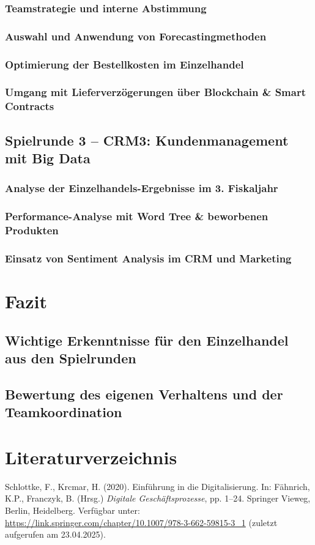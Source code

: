 \documentclass[a4paper,12pt]{article}
\begin{document}
\subsubsection{Teamstrategie und interne Abstimmung}
\subsubsection{Auswahl und Anwendung von Forecastingmethoden}
\subsubsection{Optimierung der Bestellkosten im Einzelhandel}
\subsubsection{Umgang mit Lieferverzögerungen über Blockchain \& Smart Contracts}

\subsection{Spielrunde 3 – CRM3: Kundenmanagement mit Big Data}
\subsubsection{Analyse der Einzelhandels-Ergebnisse im 3. Fiskaljahr}
\subsubsection{ Performance-Analyse mit Word Tree \& beworbenen Produkten}
\subsubsection{Einsatz von Sentiment Analysis im CRM und Marketing}
\section{Fazit}
\subsection{Wichtige Erkenntnisse für den Einzelhandel aus den Spielrunden}
\subsection{Bewertung des eigenen Verhaltens und der Teamkoordination}
\newpage
{}
\section*{Literaturverzeichnis}
\begin{thebibliography}{99}
     Schlottke, F., Krcmar, H. (2020). Einführung in die Digitalisierung. In: Fähnrich, K.P., Franczyk, B. (Hrsg.) \textit{Digitale Geschäftsprozesse}, pp. 1–24. Springer Vieweg, Berlin, Heidelberg. Verfügbar unter: \url{https://link.springer.com/chapter/10.1007/978-3-662-59815-3_1} (zuletzt aufgerufen am 23.04.2025).
\end{thebibliography}
\end{document}
